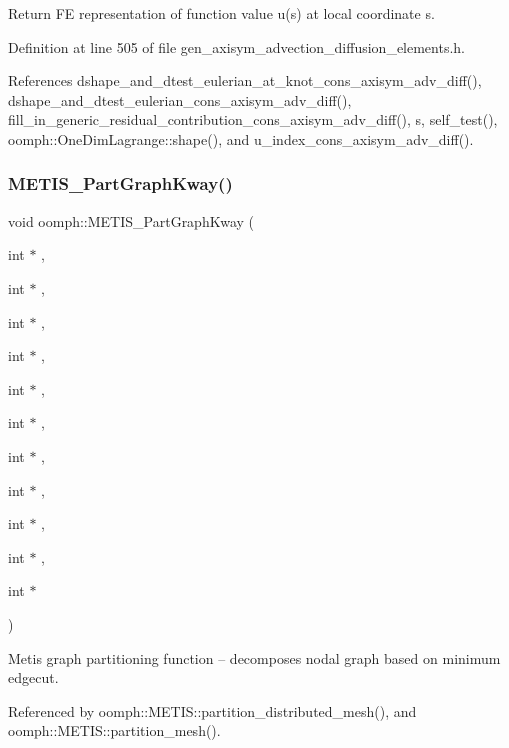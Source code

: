 Return FE representation of function value u(s) at local coordinate s. 



Definition at line 505 of file gen\+\_\+axisym\+\_\+advection\+\_\+diffusion\+\_\+elements.\+h.



References dshape\+\_\+and\+\_\+dtest\+\_\+eulerian\+\_\+at\+\_\+knot\+\_\+cons\+\_\+axisym\+\_\+adv\+\_\+diff(), dshape\+\_\+and\+\_\+dtest\+\_\+eulerian\+\_\+cons\+\_\+axisym\+\_\+adv\+\_\+diff(), fill\+\_\+in\+\_\+generic\+\_\+residual\+\_\+contribution\+\_\+cons\+\_\+axisym\+\_\+adv\+\_\+diff(), s, self\+\_\+test(), oomph\+::\+One\+Dim\+Lagrange\+::shape(), and u\+\_\+index\+\_\+cons\+\_\+axisym\+\_\+adv\+\_\+diff().

\mbox{\label{namespaceoomph_a86e73012a914a19df3d849e1c6f4b9a1}} 
\subsubsection{\texorpdfstring{M\+E\+T\+I\+S\+\_\+\+Part\+Graph\+Kway()}{METIS\_PartGraphKway()}}
{\footnotesize\ttfamily void oomph\+::\+M\+E\+T\+I\+S\+\_\+\+Part\+Graph\+Kway (\begin{DoxyParamCaption}\item[{int $\ast$}]{,  }\item[{int $\ast$}]{,  }\item[{int $\ast$}]{,  }\item[{int $\ast$}]{,  }\item[{int $\ast$}]{,  }\item[{int $\ast$}]{,  }\item[{int $\ast$}]{,  }\item[{int $\ast$}]{,  }\item[{int $\ast$}]{,  }\item[{int $\ast$}]{,  }\item[{int $\ast$}]{ }\end{DoxyParamCaption})}



Metis graph partitioning function -- decomposes nodal graph based on minimum edgecut. 



Referenced by oomph\+::\+M\+E\+T\+I\+S\+::partition\+\_\+distributed\+\_\+mesh(), and oomph\+::\+M\+E\+T\+I\+S\+::partition\+\_\+mesh().

